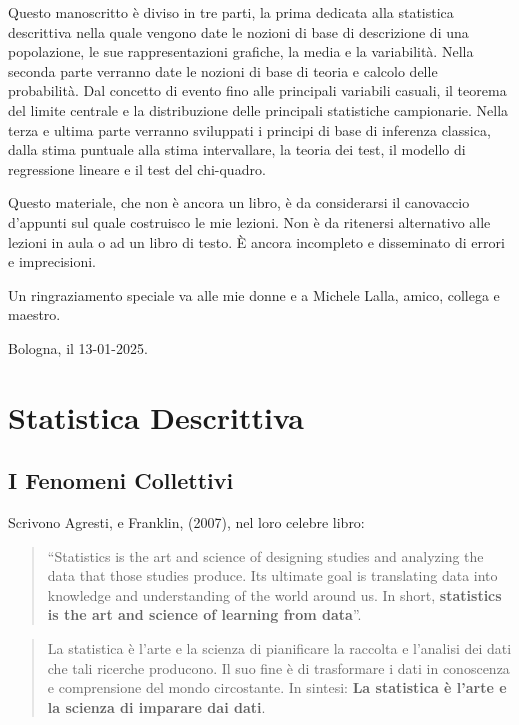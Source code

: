 \documentclass[
  11pt,
]{book}
\theoremstyle{mytheoremstyle}
\theoremstyle{mydefstyle}
\begin{document}
Questo manoscritto è diviso in tre parti, la prima dedicata alla statistica descrittiva nella quale
vengono date le nozioni di base di descrizione di una popolazione, le sue rappresentazioni grafiche,
la media e la variabilità. Nella seconda parte verranno date le nozioni di base di teoria e calcolo delle probabilità.
Dal concetto di evento fino alle principali variabili casuali, il teorema del limite centrale e la distribuzione
delle principali statistiche campionarie. Nella terza e ultima parte verranno sviluppati
i principi di base di inferenza classica, dalla stima puntuale alla stima intervallare, la teoria dei test,
il modello di regressione lineare e il test del chi-quadro.

Questo materiale, che non è ancora un libro, è da considerarsi il canovaccio d'appunti sul quale
costruisco le mie lezioni. Non è da ritenersi alternativo alle lezioni in aula o ad un libro di testo.
È ancora incompleto e disseminato di errori e imprecisioni.

Un ringraziamento speciale va alle mie donne e a Michele Lalla, amico, collega e maestro.

Bologna, il 13-01-2025.

\part{Statistica Descrittiva}

\chapter{I Fenomeni Collettivi}\label{i-fenomeni-collettivi}

Scrivono Agresti, e Franklin, (2007), nel loro celebre libro:

\begin{quote}
``Statistics is the art and science of designing studies and analyzing the data that those studies produce. Its ultimate goal is translating data into knowledge and understanding of the world around us. In short, \textbf{statistics is the art and science of learning from data}''.
\end{quote}

\begin{quote}
La statistica è l'arte e la scienza di pianificare la raccolta e l'analisi dei dati che tali ricerche producono. Il suo fine è di trasformare i dati in conoscenza e comprensione del mondo circostante. In sintesi: \textbf{La statistica è l'arte e la scienza di imparare dai dati}.
\end{quote}
\end{document}
